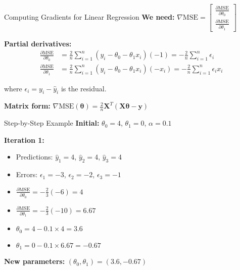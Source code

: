 \documentclass[aspectratio=169,11pt]{beamer}
\newcommand{\grad}{\nabla}
\newcommand{\vtheta}{\bm{\theta}}
\newcommand{\vy}{\bm{y}}
\newcommand{\mX}{\bm{X}}
\newcommand{\MSE}{\text{MSE}}
\begin{document}
\begin{frame}{Computing Gradients for Linear Regression}
\textbf{We need:} $\grad \MSE = \begin{bmatrix} \frac{\partial \MSE}{\partial \theta_0} \\ \frac{\partial \MSE}{\partial \theta_1} \end{bmatrix}$

\pause
\textbf{Partial derivatives:}
\begin{align}
\frac{\partial \MSE}{\partial \theta_0} &= \frac{2}{n}\sum_{i=1}^n (y_i - \theta_0 - \theta_1 x_i)(-1) = -\frac{2}{n}\sum_{i=1}^n \epsilon_i\\
\frac{\partial \MSE}{\partial \theta_1} &= \frac{2}{n}\sum_{i=1}^n (y_i - \theta_0 - \theta_1 x_i)(-x_i) = -\frac{2}{n}\sum_{i=1}^n \epsilon_i x_i
\end{align}

where $\epsilon_i = y_i - \hat{y}_i$ is the residual.

\pause
\textbf{Matrix form:} $\grad \MSE(\vtheta) = \frac{2}{n}\mX^T(\mX\vtheta - \vy)$
\end{frame}

\begin{frame}{Step-by-Step Example}
\textbf{Initial:} $\theta_0 = 4$, $\theta_1 = 0$, $\alpha = 0.1$

\pause
\textbf{Iteration 1:}
\begin{itemize}
\item Predictions: $\hat{y}_1 = 4$, $\hat{y}_2 = 4$, $\hat{y}_3 = 4$
\item Errors: $\epsilon_1 = -3$, $\epsilon_2 = -2$, $\epsilon_3 = -1$
\item $\frac{\partial \MSE}{\partial \theta_0} = -\frac{2}{3}(-6) = 4$
\item $\frac{\partial \MSE}{\partial \theta_1} = -\frac{2}{3}(-10) = 6.67$
\item $\theta_0 = 4 - 0.1 \times 4 = 3.6$
\item $\theta_1 = 0 - 0.1 \times 6.67 = -0.67$
\end{itemize}

\pause
\textbf{New parameters:} $(\theta_0, \theta_1) = (3.6, -0.67)$
\end{frame}
\end{document}
